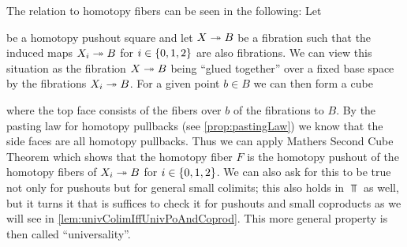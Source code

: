 The relation to homotopy fibers can be seen in the following:
Let 
\begin{center}
\end{center}
be a homotopy pushout square and let $X\xtwoheadrightarrow{} B$ be a fibration such that the induced maps $X_i\xtwoheadrightarrow{} B$ for $i\in\left\lbrace0,1,2\right\rbrace$ are also fibrations.
We can view this situation as the fibration $X\xtwoheadrightarrow{} B$ being ``glued together'' over a fixed base space by the fibrations $X_i\xtwoheadrightarrow{} B$.
For a given point $b\in B$ we can then form a cube 
\begin{center}
\end{center}
where the top face consists of the fibers over $b$ of the fibrations to $B$.
By the pasting law for homotopy pullbacks (see \cref{prop:pastingLaw}) we know that the side faces are all homotopy pullbacks.
Thus we can apply Mathers Second Cube Theorem which shows that the homotopy fiber $F$ is the homotopy pushout of the homotopy fibers of $X_i\xtwoheadrightarrow{} B$ for $i\in\left\lbrace0,1,2\right\rbrace$.
We can also ask for this to be true not only for pushouts but for general small colimits; 
this also  holds in $\Top$ as well, but it turns it that is suffices to check it for pushouts and small coproducts as we will see in \cref{lem:univColimIffUnivPoAndCoprod}.
This more general property is then called ``universality''.

